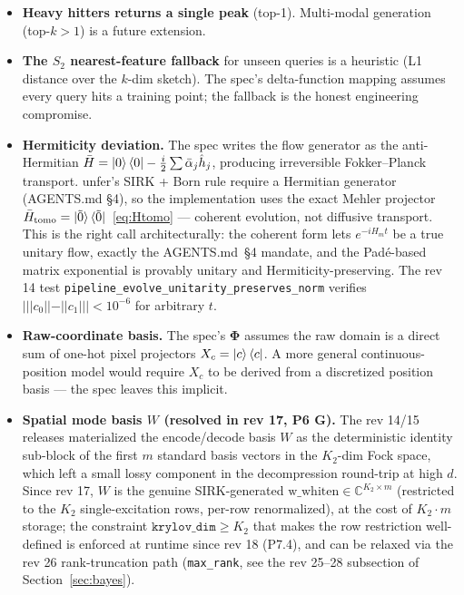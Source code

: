 \documentclass[11pt, a4paper]{article}
\newcommand{\Cset}{\mathbb{C}}
\begin{document}
\begin{itemize}
\item \textbf{Heavy hitters returns a single peak} (top-1). Multi-modal
generation (top-$k>1$) is a future extension.
\item \textbf{The $S_2$ nearest-feature fallback} for unseen queries is a
heuristic (L1 distance over the $k$-dim sketch). The spec's delta-function
mapping assumes every query hits a training point; the fallback is the
honest engineering compromise.
\item \textbf{Hermiticity deviation.} The spec writes the flow generator as
the anti-Hermitian $\bar H=\ket{0}\bra{0}-\frac{i}{2}\sum\bar\alpha_j\hat h_j$,
producing irreversible Fokker--Planck transport. unfer's SIRK + Born rule
require a Hermitian generator (AGENTS.md \S4), so the implementation uses
the exact Mehler projector
$\bar H_{\mathrm{tomo}}=\ket{\tilde 0}\bra{\tilde 0}$~\eqref{eq:Htomo}
--- coherent evolution, not diffusive transport.
This is the right call architecturally: the coherent form lets
$e^{-iH_m t}$ be a true unitary flow, exactly the AGENTS.md~\S4 mandate,
and the Pad\'e-based matrix exponential is provably unitary and
Hermiticity-preserving. The rev 14 test
\texttt{pipeline\_evolve\_unitarity\_preserves\_norm} verifies
$|||c_0||-||c_1||| < 10^{-6}$ for arbitrary $t$.
\item \textbf{Raw-coordinate basis.} The spec's $\mathbf\Phi$ assumes the
raw domain is a direct sum of one-hot pixel projectors $X_c=\ket{c}\bra{c}$.
A more general continuous-position model would require $X_c$ to be derived
from a discretized position basis --- the spec leaves this implicit.
\item \textbf{Spatial mode basis $W$ (resolved in rev 17, P6 G).} The
rev 14/15 releases materialized the encode/decode basis $W$ as the
deterministic identity sub-block of the first $m$ standard basis vectors
in the $K_2$-dim Fock space, which left a small lossy component in the
decompression round-trip at high $d$. Since rev 17, $W$ is the genuine
SIRK-generated $\mathrm{w\_whiten}\in\Cset^{K_2\times m}$ (restricted to
the $K_2$ single-excitation rows, per-row renormalized), at the cost of
$K_2\cdot m$ storage; the constraint $\texttt{krylov\_dim}\ge K_2$ that
makes the row restriction well-defined is enforced at runtime since
rev 18 (P7.4), and can be relaxed via the rev 26 rank-truncation path
(\texttt{max\_rank}, see the rev 25--28 subsection of
Section~\ref{sec:bayes}).
\end{itemize}
\end{document}
